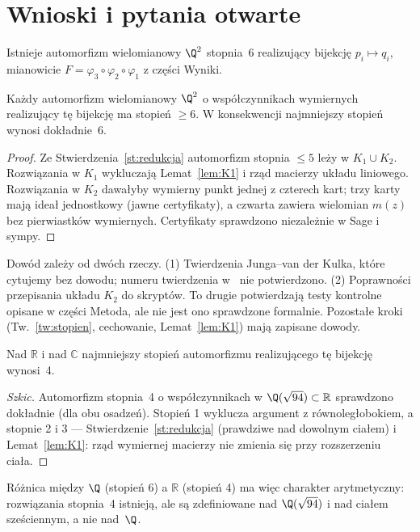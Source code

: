 \section{Wnioski i pytania otwarte}

\begin{twierdzenie}[ZWERYFIKOWANE]
Istnieje automorfizm wielomianowy $\Q^2$ stopnia~6 realizujący bijekcję $p_i\mapsto q_i$,
mianowicie $F=\varphi_3\circ\varphi_2\circ\varphi_1$ z części Wyniki.
\end{twierdzenie}

\begin{twierdzenie}\label{tw:glowne}
Każdy automorfizm wielomianowy $\Q^2$ o współczynnikach wymiernych realizujący tę bijekcję
ma stopień $\ge6$. W konsekwencji najmniejszy stopień wynosi dokładnie~6.
\end{twierdzenie}
\begin{proof}
Ze Stwierdzenia~\ref{st:redukcja} automorfizm stopnia $\le5$ leży w $K_1\cup K_2$.
Rozwiązania w $K_1$ wykluczają Lemat~\ref{lem:K1} i rząd macierzy układu liniowego.
Rozwiązania w $K_2$ dawałyby wymierny punkt jednej z czterech kart; trzy karty mają ideał
jednostkowy (jawne certyfikaty), a czwarta zawiera wielomian $m(z)$ bez pierwiastków
wymiernych. Certyfikaty sprawdzono niezależnie w Sage i sympy.
\end{proof}

\begin{uwaga}
Dowód zależy od dwóch rzeczy. (1) Twierdzenia Junga--van der Kulka, które cytujemy bez
dowodu; numeru twierdzenia w~\cite{vdEssen} nie potwierdzono. (2) Poprawności przepisania
układu $K_2$ do skryptów. To drugie potwierdzają testy kontrolne opisane w części Metoda, ale
nie jest ono sprawdzone formalnie. Pozostałe kroki (Tw.~\ref{tw:stopien}, cechowanie,
Lemat~\ref{lem:K1}) mają zapisane dowody.
\end{uwaga}

\begin{stwierdzenie}\label{st:R}
Nad $\mathbb R$ i nad $\mathbb C$ najmniejszy stopień automorfizmu realizującego tę bijekcję
wynosi~4.
\end{stwierdzenie}
\begin{proof}[Szkic]
Automorfizm stopnia~4 o współczynnikach w $\Q(\sqrt{94})\subset\mathbb R$ sprawdzono
dokładnie (dla obu osadzeń). Stopień 1 wyklucza argument z równoległobokiem, a stopnie 2 i 3
--- Stwierdzenie~\ref{st:redukcja} (prawdziwe nad dowolnym ciałem) i Lemat~\ref{lem:K1}:
rząd wymiernej macierzy nie zmienia się przy rozszerzeniu ciała.
\end{proof}
Różnica między $\Q$ (stopień 6) a $\mathbb R$ (stopień 4) ma więc charakter arytmetyczny:
rozwiązania stopnia~4 istnieją, ale są zdefiniowane nad $\Q(\sqrt{94})$ i nad ciałem
sześciennym, a nie nad~$\Q$.

